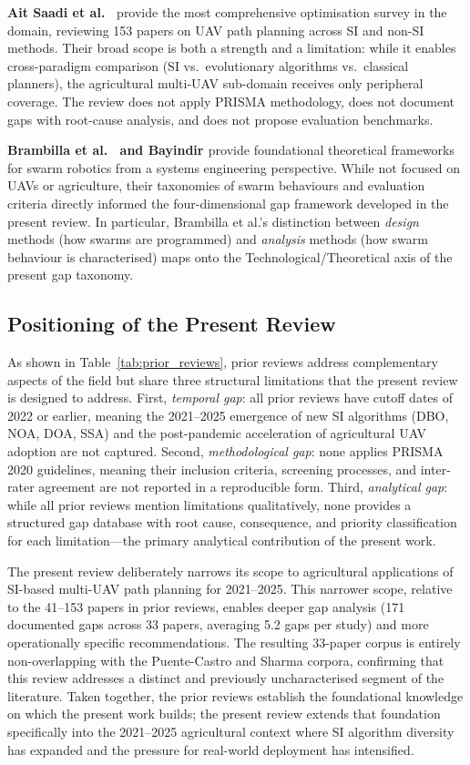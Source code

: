\documentclass[review,3p,times]{elsarticle}
\begin{document}
\textbf{Ait Saadi et al.\ \cite{aitsaadi2022}} provide the most comprehensive optimisation survey in the domain, reviewing 153 papers on UAV path planning across SI and non-SI methods. Their broad scope is both a strength and a limitation: while it enables cross-paradigm comparison (SI vs.\ evolutionary algorithms vs.\ classical planners), the agricultural multi-UAV sub-domain receives only peripheral coverage. The review does not apply PRISMA methodology, does not document gaps with root-cause analysis, and does not propose evaluation benchmarks.

\textbf{Brambilla et al.\ \cite{brambilla2013} and Bayindir \cite{bayindir2016}} provide foundational theoretical frameworks for swarm robotics from a systems engineering perspective. While not focused on UAVs or agriculture, their taxonomies of swarm behaviours and evaluation criteria directly informed the four-dimensional gap framework developed in the present review. In particular, Brambilla et al.'s distinction between \textit{design} methods (how swarms are programmed) and \textit{analysis} methods (how swarm behaviour is characterised) maps onto the Technological/Theoretical axis of the present gap taxonomy.

\subsection*{Positioning of the Present Review}

As shown in Table~\ref{tab:prior_reviews}, prior reviews address complementary aspects of the field but share three structural limitations that the present review is designed to address. First, \textit{temporal gap}: all prior reviews have cutoff dates of 2022 or earlier, meaning the 2021--2025 emergence of new SI algorithms (DBO, NOA, DOA, SSA) and the post-pandemic acceleration of agricultural UAV adoption are not captured. Second, \textit{methodological gap}: none applies PRISMA 2020 guidelines, meaning their inclusion criteria, screening processes, and inter-rater agreement are not reported in a reproducible form. Third, \textit{analytical gap}: while all prior reviews mention limitations qualitatively, none provides a structured gap database with root cause, consequence, and priority classification for each limitation---the primary analytical contribution of the present work.

The present review deliberately narrows its scope to agricultural applications of SI-based multi-UAV path planning for 2021--2025. This narrower scope, relative to the 41--153 papers in prior reviews, enables deeper gap analysis (171 documented gaps across 33 papers, averaging 5.2 gaps per study) and more operationally specific recommendations. The resulting 33-paper corpus is entirely non-overlapping with the Puente-Castro and Sharma corpora, confirming that this review addresses a distinct and previously uncharacterised segment of the literature. Taken together, the prior reviews establish the foundational knowledge on which the present work builds; the present review extends that foundation specifically into the 2021--2025 agricultural context where SI algorithm diversity has expanded and the pressure for real-world deployment has intensified.
\end{document}
